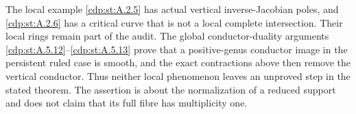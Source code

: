 The local example \ref{cdp:st:A.2.5} has actual vertical inverse-Jacobian
poles, and \ref{cdp:st:A.2.6} has a critical curve that is not a local
complete intersection. Their local rings remain part of the
audit. The global conductor-duality arguments \ref{cdp:st:A.5.12}--\ref{cdp:st:A.5.13} prove
that a positive-genus conductor image in the persistent ruled
case is smooth, and the exact contractions above then remove
the vertical conductor. Thus neither local phenomenon leaves
an unproved step in the stated theorem. The assertion
is about the normalization of a reduced support and does not
claim that its full fibre has multiplicity one.


